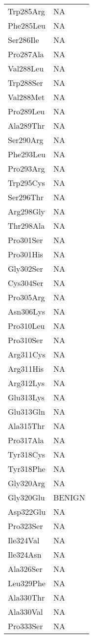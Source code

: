 \begin{tiny}
\begin{longtable}[l]{l|l}
	Trp285Arg & NA \\
	Phe285Leu & NA \\
	Ser286Ile & NA \\
	Pro287Ala & NA \\
	Val288Leu & NA \\
	Trp288Ser & NA \\
	Val288Met & NA \\
	Pro289Leu & NA \\
	Ala289Thr & NA \\
	Ser290Arg & NA \\
	Phe293Leu & NA \\
	Pro293Arg & NA \\
	Trp295Cys & NA \\
	Ser296Thr & NA \\
	Arg298Gly & NA \\
	Thr298Ala & NA \\
	Pro301Ser & NA \\
	Pro301His & NA \\
	Gly302Ser & NA \\
	Cys304Ser & NA \\
	Pro305Arg & NA \\
	Asn306Lys & NA \\
	Pro310Leu & NA \\
	Pro310Ser & NA \\
	Arg311Cys & NA \\
	Arg311His & NA \\
	Arg312Lys & NA \\
	Glu313Lys & NA \\
	Glu313Gln & NA \\
	Ala315Thr & NA \\
	Pro317Ala & NA \\
	Tyr318Cys & NA \\
	Tyr318Phe & NA \\
	Gly320Arg & NA \\
	Gly320Glu & BENIGN \\
	Asp322Glu & NA \\
	Pro323Ser & NA \\
	Ile324Val & NA \\
	Ile324Asn & NA \\
	Ala326Ser & NA \\
	Leu329Phe & NA \\
	Ala330Thr & NA \\
	Ala330Val & NA \\
	Pro333Ser & NA \\

\end{longtable}
\end{tiny}
